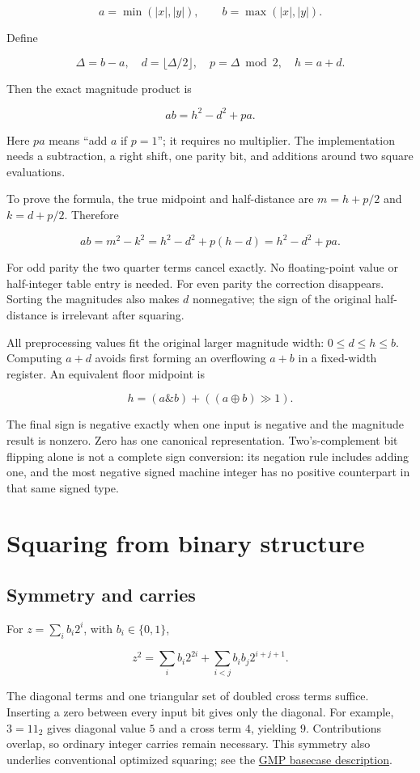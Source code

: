 \documentclass[11pt,a4paper]{article}
\begin{document}
\[
a=\min(|x|,|y|),\qquad b=\max(|x|,|y|).
\]

Define

\[
\Delta=b-a,\quad d=\lfloor\Delta/2\rfloor,\quad p=\Delta\bmod 2,\quad h=a+d.
\]

Then the exact magnitude product is

\[
\boxed{ab=h^2-d^2+pa.}
\]

Here $pa$ means ``add $a$ if $p=1$''; it requires no multiplier. The implementation needs a subtraction, a right shift, one parity bit, and additions around two square evaluations.

To prove the formula, the true midpoint and half-distance are $m=h+p/2$ and $k=d+p/2$. Therefore

\[
ab=m^2-k^2=h^2-d^2+p(h-d)=h^2-d^2+pa.
\]

For odd parity the two quarter terms cancel exactly. No floating-point value or half-integer table entry is needed. For even parity the correction disappears. Sorting the magnitudes also makes $d$ nonnegative; the sign of the original half-distance is irrelevant after squaring.

All preprocessing values fit the original larger magnitude width: $0\le d\le h\le b$. Computing $a+d$ avoids first forming an overflowing $a+b$ in a fixed-width register. An equivalent floor midpoint is

\[
h=(a\mathbin{\&}b)+((a\mathbin{\oplus}b)\gg1).
\]

The final sign is negative exactly when one input is negative and the magnitude result is nonzero. Zero has one canonical representation. Two's-complement bit flipping alone is not a complete sign conversion: its negation rule includes adding one, and the most negative signed machine integer has no positive counterpart in that same signed type.

\section{Squaring from binary structure}

\subsection{Symmetry and carries}

For $z=\sum_i b_i2^i$, with $b_i\in\{0,1\}$,

\[
z^2=\sum_i b_i2^{2i}+\sum_{i<j}b_ib_j2^{i+j+1}.
\]

The diagonal terms and one triangular set of doubled cross terms suffice. Inserting a zero between every input bit gives only the diagonal. For example, $3=11_2$ gives diagonal value $5$ and a cross term $4$, yielding $9$. Contributions overlap, so ordinary integer carries remain necessary. This symmetry also underlies conventional optimized squaring; see the \href{\detokenize{https://gmplib.org/manual/Basecase-Multiplication}}{GMP basecase description}.
\end{document}
